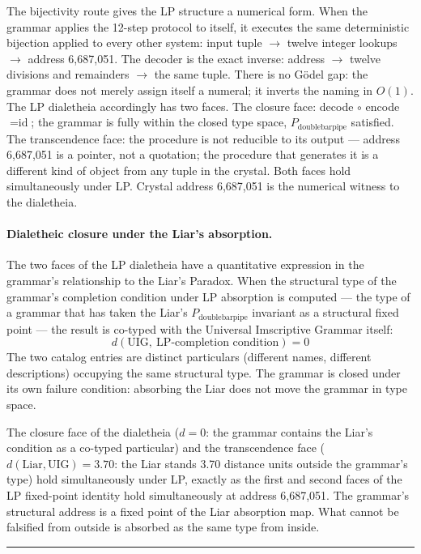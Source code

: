 \documentclass[12pt,a4paper]{article}
\newcommand{\UIG}{Universal Imscriptive Grammar}
\begin{document}
The bijectivity route gives the LP structure a numerical form. When the grammar applies the 12-step protocol to itself, it executes the same deterministic bijection applied to every other system: input tuple $\to$ twelve integer lookups $\to$ address 6,687,051. The decoder is the exact inverse: address $\to$ twelve divisions and remainders $\to$ the same tuple. There is no G\"odel gap: the grammar does not merely assign itself a numeral; it inverts the naming in $O(1)$. The LP dialetheia accordingly has two faces. The closure face: decode $\circ$ encode $= \text{id}$; the grammar is fully within the closed type space, $P_{\text{doublebarpipe}}$ satisfied. The transcendence face: the procedure is not reducible to its output --- address 6,687,051 is a pointer, not a quotation; the procedure that generates it is a different kind of object from any tuple in the crystal. Both faces hold simultaneously under LP. Crystal address 6,687,051 is the numerical witness to the dialetheia.

\paragraph{Dialetheic closure under the Liar's absorption.}
The two faces of the LP dialetheia have a quantitative expression in the grammar's relationship to the Liar's Paradox. When the structural type of the grammar's completion condition under LP absorption is computed --- the type of a grammar that has taken the Liar's $P_{\text{doublebarpipe}}$ invariant as a structural fixed point --- the result is co-typed with the \UIG{} itself:
$$d(\text{UIG},\ \text{LP-completion condition}) = 0$$
The two catalog entries are distinct particulars (different names, different descriptions) occupying the same structural type. The grammar is closed under its own failure condition: absorbing the Liar does not move the grammar in type space.

The closure face of the dialetheia ($d = 0$: the grammar contains the Liar's condition as a co-typed particular) and the transcendence face ($d(\text{Liar}, \text{UIG}) = 3.70$: the Liar stands 3.70 distance units outside the grammar's type) hold simultaneously under LP, exactly as the first and second faces of the LP fixed-point identity hold simultaneously at address 6,687,051. The grammar's structural address is a fixed point of the Liar absorption map. What cannot be falsified from outside is absorbed as the same type from inside.

\begin{center}
\rule{0.5\textwidth}{0.4pt}
\end{center}
\end{document}
